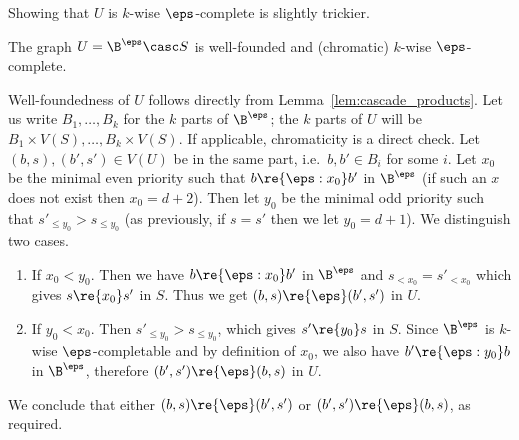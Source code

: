 Showing that $U$ is $k$-wise $\eps$-complete is slightly trickier.

\begin{claim}
    The graph $U = \B^\eps \casc S$ is well-founded and (chromatic) $k$-wise $\eps$-complete.
\end{claim}

\begin{claimproof}
    Well-foundedness of $U$ follows directly from Lemma~\ref{lem:cascade_products}.
    Let us write $B_1,\dots,B_k$ for the $k$ parts of $\B^\eps$; the $k$ parts of $U$ will be $B_1 \times V(S),\dots, B_k \times V(S)$.
    If applicable, chromaticity is a direct check.
    Let $(b,s),(b',s') \in V(U)$ be in the same part, i.e.~$b,b' \in B_i$ for some $i$.
    Let $x_0$ be the minimal even priority such that 
    $b \re{\eps:x_0} b'$ in $\B^\eps$ 
    (if such an $x$ does not exist then $x_0=d+2$).
    Then let $y_0$ be the minimal odd priority such that $s'_{\leq y_0} > s_{\leq y_0}$ (as previously, if $s=s'$ then we let $y_0=d+1$).
    We distinguish two cases.
    \begin{enumerate}[(1)]
        \item If $x_0 < y_0$. Then we have $b \re{\eps:x_0} b'$ in $\B^\eps$ and $s_{<x_0} = s'_{<x_0}$ which gives $s \re{x_0} s'$ in $S$.
        Thus we get $(b,s) \re{\eps} (b',s')$ in $U$.
        \item If $y_0 < x_0$. Then $s'_{\leq y_0} > s_{\leq y_0}$, which gives $s' \re{y_0} s$ in $S$.
        Since $\B^\eps$ is $k$-wise $\eps$-completable and by definition of $x_0$, we also have $b' \re{\eps:y_0} b$ in $\B^\eps$, therefore $(b',s') \re{\eps} (b,s)$ in $U$.
    \end{enumerate}

    We conclude that either $(b,s)\re{\eps}(b',s')$ or $(b',s') \re{\eps} (b,s)$, as required.
\end{claimproof}
